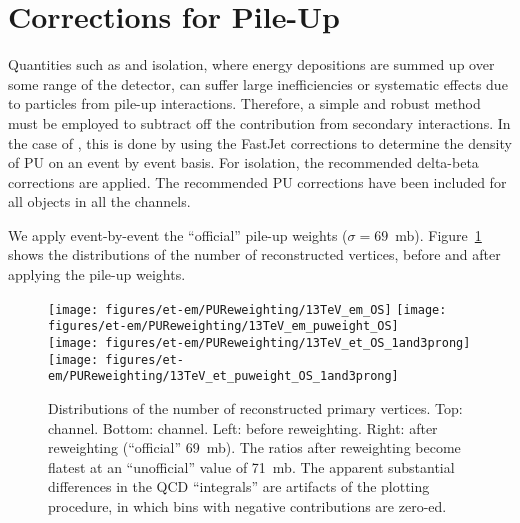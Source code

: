 \section{Corrections for Pile-Up}

Quantities such as \MET and isolation, where energy depositions are
summed up over some range of the detector, can suffer large
inefficiencies or systematic effects due to particles from pile-up
interactions. Therefore, a simple and robust method must be employed
to subtract off the contribution from secondary interactions.  In the
case of \MET, this is done by using the FastJet corrections to
determine the density of PU on an event by event basis. For isolation, the 
recommended delta-beta corrections are applied. The
recommended PU corrections have been included for all objects in all
the channels.




We apply event-by-event the ``official'' pile-up weights
($\sigma=69$~mb).  Figure~\ref{fig:nvtx} shows the distributions of
the number of reconstructed vertices, before and after applying the
pile-up weights.

\begin{figure}
  \centering
  \texttt{[image: figures/et-em/PUReweighting/13TeV\_em\_OS]}
  \texttt{[image: figures/et-em/PUReweighting/13TeV\_em\_puweight\_OS]} \\
  \texttt{[image: figures/et-em/PUReweighting/13TeV\_et\_OS\_1and3prong]}
  \texttt{[image: figures/et-em/PUReweighting/13TeV\_et\_puweight\_OS\_1and3prong]} \\
  \caption{\label{fig:nvtx} Distributions of the number of
    reconstructed primary vertices.  Top: \emu channel.  Bottom: \etau
    channel.  Left: before reweighting.  Right: after reweighting
    (``official'' 69~mb).  The ratios after reweighting become flatest
    at an ``unofficial'' value of 71~mb.  The apparent substantial
    differences in the QCD ``integrals'' are artifacts of the plotting
    procedure, in which bins with negative contributions are zero-ed.}
\end{figure}
